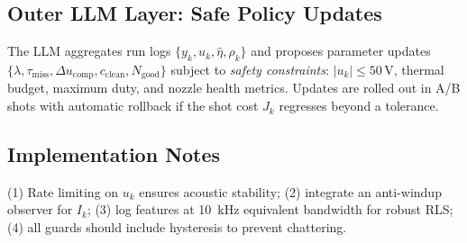 \subsection{Outer LLM Layer: Safe Policy Updates}
The LLM aggregates run logs $\{y_k,u_k,\hat{\eta},\rho_k\}$ and proposes parameter updates
$\{\lambda,\tau_{\text{miss}},\Delta u_{\text{comp}},c_{\text{clean}},N_{\text{good}}\}$ subject to
\emph{safety constraints}: $|u_k|\le 50\,\mathrm{V}$, thermal budget, maximum duty, and
nozzle health metrics. Updates are rolled out in A/B shots with automatic rollback if
the shot cost $J_k$ regresses beyond a tolerance.

\subsection{Implementation Notes}
(1) Rate limiting on $u_k$ ensures acoustic stability; (2) integrate an anti-windup
observer for $I_k$; (3) log features at \SI{10}{kHz} equivalent bandwidth for robust
RLS; (4) all guards should include hysteresis to prevent chattering.
